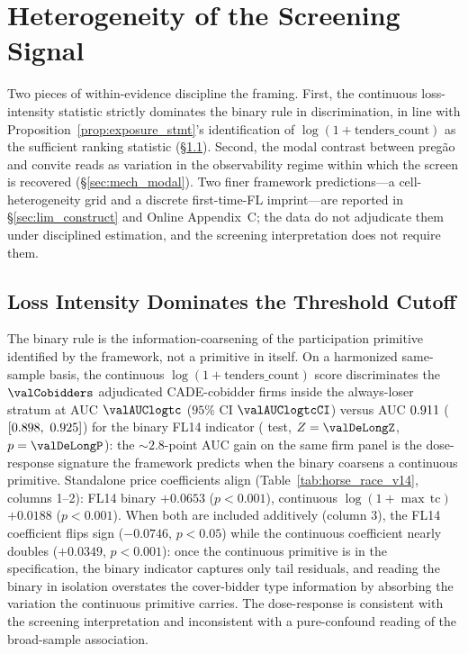 \section{Heterogeneity of the Screening Signal}
\label{sec:mechanisms}

Two pieces of within-evidence discipline the framing. First, the
continuous loss-intensity statistic strictly dominates the
binary rule in discrimination, in line with
Proposition~\ref{prop:exposure_stmt}'s identification of
$\log(1+\text{tenders\_count})$ as the sufficient ranking
statistic (\S\ref{sec:mech_horse_race}). Second, the modal
contrast between preg\~ao and convite reads as variation in the
observability regime within which the screen is recovered
(\S\ref{sec:mech_modal}). Two finer framework predictions---a
cell-heterogeneity grid and a discrete first-time-FL
imprint---are reported in \S\ref{sec:lim_construct} and Online
Appendix~C; the data do not adjudicate them under disciplined
estimation, and the screening interpretation does not require
them.

\subsection{Loss Intensity Dominates the Threshold Cutoff}
\label{sec:mech_horse_race}

The binary rule is the information-coarsening of the
participation primitive identified by the framework, not a
primitive in itself. On a harmonized same-sample basis, the
continuous $\log(1+\text{tenders\_count})$ score discriminates
the $\valCobidders$ adjudicated CADE-cobidder firms inside the
always-loser stratum at AUC $\valAUClogtc$
($95\%$ CI $\valAUClogtcCI$) versus AUC $0.911$
($[0.898,\ 0.925]$) for the binary FL14 indicator
(\citealt{delong1988comparing} test, $Z = \valDeLongZ$,
$p = \valDeLongP$): the $\sim\!2.8$-point AUC gain on the same
firm panel is the dose-response signature the framework predicts
when the binary coarsens a continuous primitive. Standalone price
coefficients align (Table~\ref{tab:horse_race_v14}, columns
1--2): FL14 binary $+0.0653$ ($p<0.001$), continuous
$\log(1+\max\,\text{tc})$ $+0.0188$ ($p<0.001$). When both are
included additively (column 3), the FL14 coefficient flips sign
($-0.0746$, $p<0.05$) while the continuous coefficient nearly
doubles ($+0.0349$, $p<0.001$): once the continuous primitive is
in the specification, the binary indicator captures only tail
residuals, and reading the binary in isolation overstates the
cover-bidder type information by absorbing the variation the
continuous primitive carries. The dose-response is consistent
with the screening interpretation and inconsistent with a
pure-confound reading of the broad-sample association.

